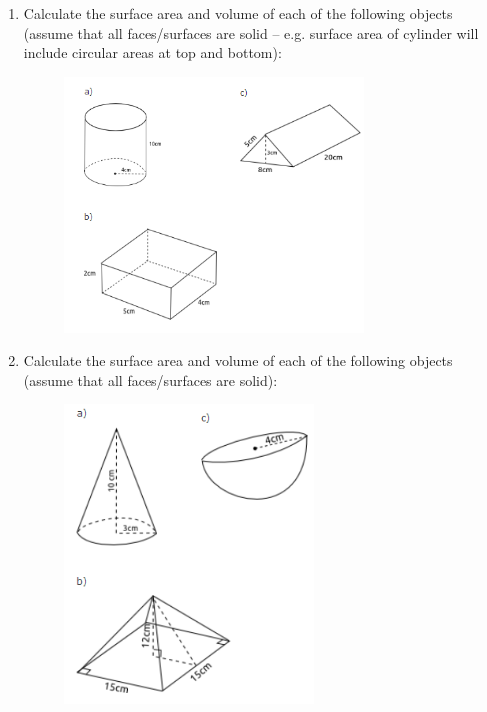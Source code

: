 \begin{enumerate}[noitemsep, label=\textbf{\arabic*}. ]
\begin{figure}[H]
\begin{center}
      \vspace{2pt}
    \vspace{.1in}
    \end{center}
 \end{figure}               \label{m39358*uid1217}\item Calculate the surface area and volume of each of the following objects (assume that all faces/surfaces are solid -- e.g. surface area of cylinder will include circular areas at top and bottom):
    \setcounter{subfigure}{0}
	\begin{figure}[H] %
    \begin{center}
    \label{m39358*id320601!!!underscore!!!media}\label{m39358*id320601!!!underscore!!!printimage}\includegraphics[width=300px]{col11306.imgs/m39358_MG10C14_042.png} %
      \vspace{2pt}
    \vspace{.1in}
    \end{center}
 \end{figure}               \label{m39358*uid1218}\item Calculate the surface area and volume of each of the following objects (assume that all faces/surfaces are solid):
    \setcounter{subfigure}{0}
	\begin{figure}[H] %
    \begin{center}
    \label{m39358*id320602!!!underscore!!!media}\label{m39358*id320602!!!underscore!!!printimage}\includegraphics[height=300px]{col11306.imgs/m39358_MG10C14_043.png} %

\end{center}
\end{figure}
\end{enumerate}
